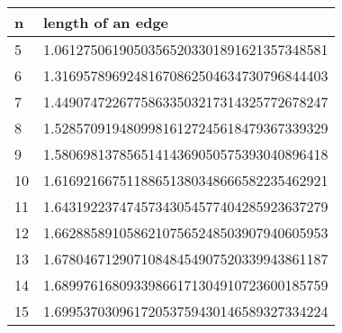 \documentclass[]{article}
\numberwithin{equation}{section}
\begin{document}
	\begin{table}[H]
		\begin{tabular}{|l|l|}
			\hline
			n  & length of an edge                         \\ \hline
			5  & 1.06127506190503565203301891621357348581  \\ \hline
			6  & 1.31695789692481670862504634730796844403  \\ \hline
			7  & 1.44907472267758633503217314325772678247  \\ \hline
			8  & 1.52857091948099816127245618479367339329  \\ \hline
			9  & 1.58069813785651414369050575393040896418  \\ \hline
			10 & 1.61692166751188651380348666582235462921  \\ \hline
			11 & 1.64319223747457343054577404285923637279  \\ \hline
			12 & 1.66288589105862107565248503907940605953  \\ \hline
			13 & 1.67804671290710848454907520339943861187  \\ \hline
			14 & 1.68997616809339866171304910723600185759  \\ \hline
			15 & 1.69953703096172053759430146589327334224  \\ \hline
		\end{tabular}
	\end{table}
	
\end{document}

